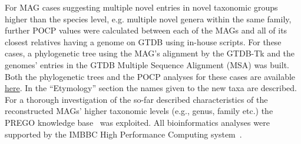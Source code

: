     For MAG cases suggesting multiple novel entries in novel taxonomic groups higher than the species level, 
    e.g. multiple novel genera within the same family, further POCP values were calculated between each of the MAGs 
    and all of its closest relatives having a genome on GTDB using in-house scripts. 
    For these cases, a phylogenetic tree using the MAG’s alignment by the GTDB-Tk and the genomes’ entries in the 
    GTDB Multiple Sequence Alignment (MSA) was built. 
    Both the phylogenetic trees and the POCP analyses for these cases are available \href{https://github.com/hariszaf/karpathos-swamp/tree/main/MAGs/Phylogenies}{here}. 
    In the “Etymology” section the names given to the new taxa are described. 
    For a thorough investigation of the so-far described characteristics of the reconstructed MAGs’ higher taxonomic levels 
    (e.g., genus, family etc.) the PREGO knowledge base~\citep{zafeiropoulos_prego_2022} was exploited.
    All bioinformatics analyses were supported by the IMBBC High Performance Computing system~\citep{zafeiropoulos_0s_2021}.
